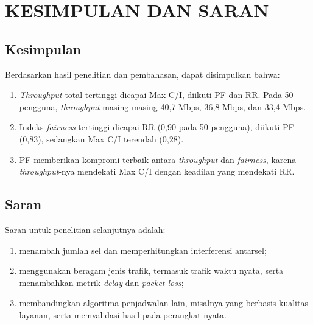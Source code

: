 \chapter{KESIMPULAN DAN SARAN}

\section{Kesimpulan}
Berdasarkan hasil penelitian dan pembahasan, dapat disimpulkan bahwa:
\begin{enumerate}
\item \textit{Throughput} total tertinggi dicapai Max C/I, diikuti PF dan RR. Pada 50 pengguna, \textit{throughput} masing-masing 40,7 Mbps, 36,8 Mbps, dan 33,4 Mbps.
\item Indeks \textit{fairness} tertinggi dicapai RR (0,90 pada 50 pengguna), diikuti PF (0,83), sedangkan Max C/I terendah (0,28).
\item PF memberikan kompromi terbaik antara \textit{throughput} dan \textit{fairness}, karena \textit{throughput}-nya mendekati Max C/I dengan keadilan yang mendekati RR.
\end{enumerate}

\section{Saran}
Saran untuk penelitian selanjutnya adalah:
\begin{enumerate}
\item menambah jumlah sel dan memperhitungkan interferensi antarsel;
\item menggunakan beragam jenis trafik, termasuk trafik waktu nyata, serta menambahkan metrik \textit{delay} dan \textit{packet loss};
\item membandingkan algoritma penjadwalan lain, misalnya yang berbasis kualitas layanan, serta memvalidasi hasil pada perangkat nyata.
\end{enumerate}
